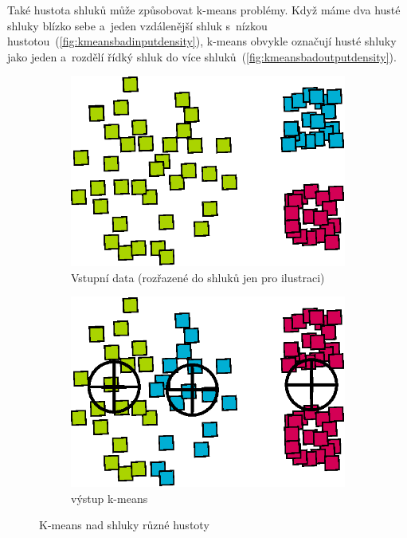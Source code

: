 Také hustota shluků může způsobovat k-means problémy. Když máme dva husté shluky blízko sebe a~jeden vzdálenější shluk s~nízkou hustotou~(\autoref{fig:kmeansbadinputdensity}), k-means obvykle označují husté shluky jako jeden a~rozdělí řídký shluk do více shluků~(\autoref{fig:kmeansbadoutputdensity}).
\begin{figure}[h]
\begin{subfigure}{.49\textwidth}
  \centering
  \includegraphics[width=.5\linewidth]{img/kmeans_badInputSampleDensity.eps}
  \caption{Vstupní data (rozřazené do shluků jen pro ilustraci)}
  \label{fig:kmeansbadinputdensity}
\end{subfigure}
\begin{subfigure}{.49\textwidth}
  \centering
  \includegraphics[width=.5\linewidth]{img/kmeans_badOutputSampleDensity.eps}
  \caption{výstup k-means}
  \label{fig:kmeansbadoutputdensity}
\end{subfigure}
\caption{K-means nad shluky různé hustoty}
\end{figure}

